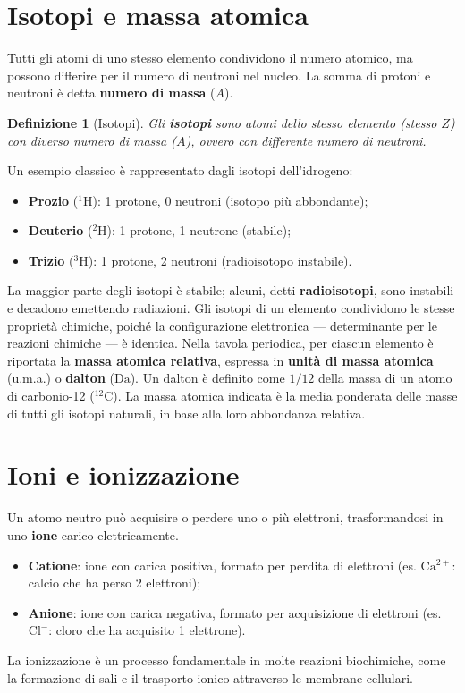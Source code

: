 \documentclass[12pt,a4paper]{report}
\newtheorem{definizione}{Definizione}[section]
\begin{document}
\section{Isotopi e massa atomica}
Tutti gli atomi di uno stesso elemento condividono il numero atomico, ma possono differire per il numero di neutroni nel nucleo. La somma di protoni e neutroni è detta \textbf{numero di massa} (\(A\)).
\begin{definizione}[Isotopi]
Gli \textbf{isotopi} sono atomi dello stesso elemento (stesso \(Z\)) con diverso numero di massa (\(A\)), ovvero con differente numero di neutroni.
\end{definizione}
Un esempio classico è rappresentato dagli isotopi dell'idrogeno:
\begin{itemize}
\item \textbf{Prozio} (\(^1\mathrm{H}\)): 1 protone, 0 neutroni (isotopo più abbondante);
\item \textbf{Deuterio} (\(^2\mathrm{H}\)): 1 protone, 1 neutrone (stabile);
\item \textbf{Trizio} (\(^3\mathrm{H}\)): 1 protone, 2 neutroni (radioisotopo instabile).
\end{itemize}
La maggior parte degli isotopi è stabile; alcuni, detti \textbf{radioisotopi}, sono instabili e decadono emettendo radiazioni. Gli isotopi di un elemento condividono le stesse proprietà chimiche, poiché la configurazione elettronica --- determinante per le reazioni chimiche --- è identica.
Nella tavola periodica, per ciascun elemento è riportata la \textbf{massa atomica relativa}, espressa in \textbf{unità di massa atomica} (u.m.a.) o \textbf{dalton} (\(\mathrm{Da}\)). Un dalton è definito come \(1/12\) della massa di un atomo di carbonio-12 (\(^{12}\mathrm{C}\)). La massa atomica indicata è la media ponderata delle masse di tutti gli isotopi naturali, in base alla loro abbondanza relativa.

\section{Ioni e ionizzazione}
Un atomo neutro può acquisire o perdere uno o più elettroni, trasformandosi in uno \textbf{ione} carico elettricamente.
\begin{itemize}
\item \textbf{Catione}: ione con carica positiva, formato per perdita di elettroni (es. \(\mathrm{Ca^{2+}}\): calcio che ha perso 2 elettroni);
\item \textbf{Anione}: ione con carica negativa, formato per acquisizione di elettroni (es. \(\mathrm{Cl^-}\): cloro che ha acquisito 1 elettrone).
\end{itemize}
La ionizzazione è un processo fondamentale in molte reazioni biochimiche, come la formazione di sali e il trasporto ionico attraverso le membrane cellulari.
\end{document}
